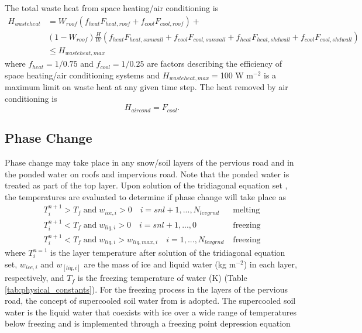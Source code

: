 \documentclass[12pt,authoryear]{elsarticle}
\numberwithin{equation}{section} %
\begin{document}
The total waste heat from space heating/air conditioning is
\begin{equation}
\label{eq:wasteheat_flux}
\begin{aligned}
H_{wasteheat} 
& = W_{roof}(f_{heat}F_{heat,roof}+f_{cool}F_{cool,roof}) + \\
& (1-W_{roof})\frac{H}{W}(f_{heat}F_{heat,sunwall}+f_{cool}F_{cool,sunwall}+f_{heat}F_{heat,shdwall}+f_{cool}F_{cool,shdwall}) \\
& \leq H_{wasteheat,max} 
\end{aligned}
\end{equation}
where $f_{heat}=1/0.75$ and $f_{cool}=1/0.25$ are factors describing the efficiency of space heating/air conditioning systems and $H_{wasteheat,max}=$100 W m$^{-2}$ is a maximum limit on waste heat at any given time step. The heat removed by air conditioning is
\begin{equation}
\label{eq:air_conditioning_flux}
H_{aircond} = F_{cool}.
\end{equation}

\subsection{Phase Change}
\label{sec:phase_change}
%
Phase change may take place in any snow/soil layers of the pervious road and in the
ponded water on roofs and impervious road. Note that the ponded water is treated as part of the top layer. Upon solution of the tridiagonal equation set \citep{pressNumericalRecipesFORTRAN1992}, the temperatures are evaluated to determine if phase change will take place as
\begin{equation}
\label{eq:layer_temperature_phase}
\begin{aligned}
T_{i}^{n+1} > T_{f} \; \textrm{and} \; w_{ice,i}>0 \quad i=snl+1,...,N_{levgrnd} \; & \textrm{melting} \\
T_{i}^{n+1} < T_{f} \; \textrm{and} \; w_{liq,i}>0 \quad i=snl+1,...,0 \; & \textrm{freezing} \\
T_{i}^{n+1} < T_{f} \; \textrm{and} \; w_{liq,i}>w_{liq,max,i} \quad i=1,...,N_{levgrnd} \; & \textrm{freezing}
\end{aligned}
\end{equation}
where $T_{i}^{n=1}$ is the layer temperature after solution of the tridiagonal equation set, $w_{ice,i}$ and $w_[liq,i]$ are the mass of ice and liquid water (kg m$^{-2}$) in each layer, respectively, and $T_{f}$ is the freezing temperature of water (K) (Table \ref{tab:physical_constants}). For the freezing process in the layers of the pervious road, the concept of supercooled soil water from \cite{niuEffectsFrozenSoil2006} is adopted. The supercooled soil water is the liquid water that coexists with ice over a wide range of temperatures below freezing and is implemented through a freezing point depression equation
\end{document}
